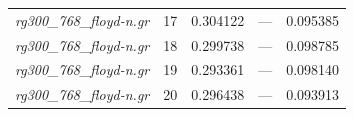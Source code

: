 \documentclass[12pt]{article}
\begin{document}
\begin{longtable}{l|l|lll}
\textit{rg300\_768\_floyd-n.gr}  &  17       & 0.304122               & ---                  & 0.095385                   \\
\textit{rg300\_768\_floyd-n.gr}  &  18       & 0.299738               & ---                  & 0.098785                   \\
\textit{rg300\_768\_floyd-n.gr}  &  19       & 0.293361               & ---                  & 0.098140                   \\
\textit{rg300\_768\_floyd-n.gr}  &  20       & 0.296438               & ---                  & 0.093913  \\ \hline
\end{longtable}



\end{document}
